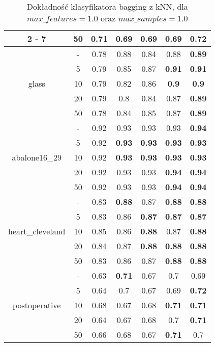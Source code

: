 \begin{table}[H]
\begin{center}
{\begin{tabular}{c|c|ccccc}
					\cline{2%
						-%
						7}%
					&50&0.71&0.69&0.69&0.69&\textbf{0.72}\\%
					\hline%
					\multirow{5}{*}{glass}&{-}&0.78&0.88&0.84&0.88&\textbf{0.89}\\%
					\cline{2%
						-%
						7}%
					&5&0.79&0.85&0.87&\textbf{0.91}&\textbf{0.91}\\%
					\cline{2%
						-%
						7}%
					&10&0.79&0.82&0.86&\textbf{0.9}&\textbf{0.9}\\%
					\cline{2%
						-%
						7}%
					&20&0.79&0.8&0.84&0.87&\textbf{0.89}\\%
					\cline{2%
						-%
						7}%
					&50&0.78&0.84&0.85&0.87&\textbf{0.89}\\%
					\hline%
					\multirow{5}{*}{abalone16\_29}&{-}&0.92&0.93&0.93&0.93&\textbf{0.94}\\%
					\cline{2%
						-%
						7}%
					&5&0.92&\textbf{0.93}&\textbf{0.93}&\textbf{0.93}&\textbf{0.93}\\%
					\cline{2%
						-%
						7}%
					&10&0.92&\textbf{0.93}&\textbf{0.93}&\textbf{0.93}&\textbf{0.93}\\%
					\cline{2%
						-%
						7}%
					&20&0.92&0.93&0.93&\textbf{0.94}&\textbf{0.94}\\%
					\cline{2%
						-%
						7}%
					&50&0.92&0.93&0.93&\textbf{0.94}&\textbf{0.94}\\%
					\hline%
					\multirow{5}{*}{heart\_cleveland}&{-}&0.83&\textbf{0.88}&0.87&\textbf{0.88}&\textbf{0.88}\\%
					\cline{2%
						-%
						7}%
					&5&0.83&0.86&\textbf{0.87}&\textbf{0.87}&\textbf{0.87}\\%
					\cline{2%
						-%
						7}%
					&10&0.85&0.86&\textbf{0.88}&0.87&\textbf{0.88}\\%
					\cline{2%
						-%
						7}%
					&20&0.84&0.87&\textbf{0.88}&\textbf{0.88}&\textbf{0.88}\\%
					\cline{2%
						-%
						7}%
					&50&0.83&0.86&0.87&\textbf{0.88}&\textbf{0.88}\\%
					\hline%
					\multirow{5}{*}{postoperative}&{-}&0.63&\textbf{0.71}&0.67&0.7&0.69\\%
					\cline{2%
						-%
						7}%
					&5&0.64&0.7&0.67&0.69&\textbf{0.72}\\%
					\cline{2%
						-%
						7}%
					&10&0.68&0.67&0.68&\textbf{0.71}&\textbf{0.71}\\%
					\cline{2%
						-%
						7}%
					&20&0.64&0.67&0.68&0.7&\textbf{0.71}\\%
					\cline{2%
						-%
						7}%
					&50&0.66&0.68&0.67&\textbf{0.71}&0.7\\%
					\hline%
				\end{tabular}}
				\caption{Dokładność klasyfikatora bagging z kNN, dla $max\_features = 1.0$ oraz $max\_samples = 1.0$}
				\label{baggingknnacc}
			\end{center}
		\end{table}
